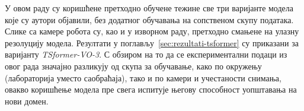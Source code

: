 \documentclass[12pt]{article}
\begin{document}
У овом раду су коришћене претходно обучене тежине све три варијанте модела
које су аутори објавили, без додатног обучавања на сопственом скупу података.
Слике са камере робота су, као и у изворном раду, претходно смањене на улазну
резолуцију модела. Резултати у поглављу~\ref{sec:rezultati-tsformer} су
приказани за варијанту \textit{TSformer-VO-3}.
С обзиром на то да се експериментални подаци из овог рада значајно разликују од
скупа за обучавање, како по окружењу (лабораторија уместо саобраћаја), тако и
по камери и учестаности снимања, овакво коришћење модела пре свега испитује
његову способност уопштавања на нови домен.

\newpage
\printbibliography
\end{document}
